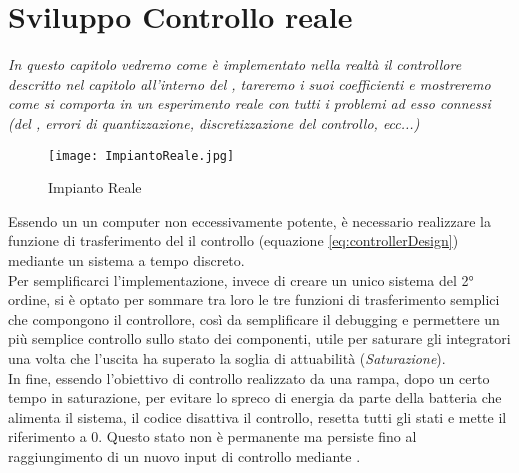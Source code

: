 \chapter{Sviluppo Controllo reale}\label{cap:controlDevelop}

\begin{minipage}{12cm}\textit{
		In questo capitolo vedremo come è implementato nella realtà il controllore descritto nel capitolo  all'interno del \microControllore, tareremo i suoi coefficienti e mostreremo come si comporta in un esperimento reale con tutti i problemi ad esso connessi (\nonLinearita del \cite*{IBT-2}, errori di quantizzazione, discretizzazione del controllo, ecc...)
	}
\end{minipage}


\begin{figure}[H]
	\centering
	\caption[Impianto Reale]{Impianto Reale}
	\texttt{[image: ImpiantoReale.jpg]}
\end{figure}
\noindent
Essendo un \microControllore un computer non eccessivamente potente, è necessario realizzare la funzione di trasferimento del il controllo (equazione \ref{eq:controllerDesign}) mediante un sistema a tempo discreto.\\
Per semplificarci l'implementazione, invece di creare un unico sistema del 2° ordine, si è optato per sommare tra loro le tre funzioni di trasferimento semplici che compongono il controllore, così da semplificare il debugging e permettere un più semplice controllo sullo stato dei componenti, utile per saturare gli integratori una volta che l'uscita ha superato la soglia di attuabilità (\textit{Saturazione}).\\
In fine, essendo l'obiettivo di controllo realizzato da una rampa, dopo un certo tempo in saturazione, per evitare lo spreco di energia da parte della batteria che alimenta il sistema, il codice disattiva il controllo, resetta tutti gli stati e mette il riferimento a 0. Questo stato non è permanente ma persiste fino al raggiungimento di un nuovo input di controllo mediante \cite*{EMP}.

\newpage
